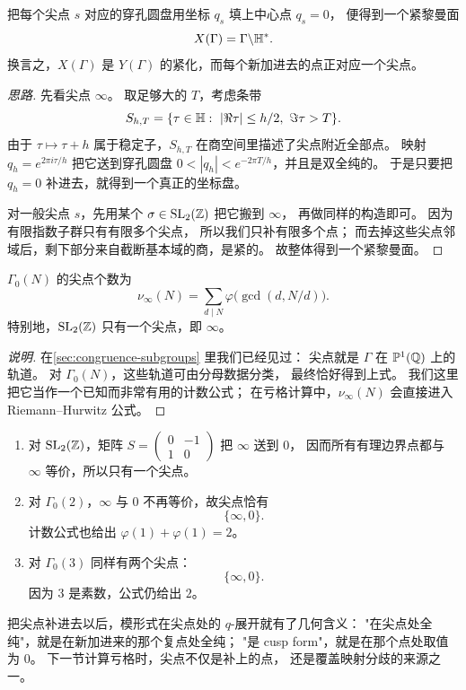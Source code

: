

\begin{theorem}
\label{thm:x-gamma-compact-riemann}
把每个尖点 $s$ 对应的穿孔圆盘用坐标 $q_s$ 填上中心点 $q_s=0$，
便得到一个紧黎曼面
\[
  X(\Gamma)=\Gamma\backslash\mathbb{H}^*.
\]
换言之，$X(\Gamma)$ 是 $Y(\Gamma)$ 的紧化，而每个新加进去的点正对应一个尖点。
\end{theorem}

\begin{proof}[思路]
先看尖点 $\infty$。
取足够大的 $T$，考虑条带
\[
  S_{h,T}=\{\tau\in\HH:\ |\Re\tau|\le h/2,\ \Im\tau>T\}.
\]
由于 $\tau\mapsto\tau+h$ 属于稳定子，$S_{h,T}$ 在商空间里描述了尖点附近全部点。
映射 $q_h=e^{2\pi i\tau/h}$ 把它送到穿孔圆盘
$0<|q_h|<e^{-2\pi T/h}$，并且是双全纯的。
于是只要把 $q_h=0$ 补进去，就得到一个真正的坐标盘。

对一般尖点 $s$，先用某个 $\sigma\in\mathrm{SL}_2(\mathbb{Z})$ 把它搬到 $\infty$，
再做同样的构造即可。
因为有限指数子群只有有限多个尖点，
所以我们只补有限多个点；
而去掉这些尖点邻域后，剩下部分来自截断基本域的商，是紧的。
故整体得到一个紧黎曼面。
\end{proof}

\begin{proposition}
\label{prop:number-of-cusps-gamma0N}
$\Gamma_0(N)$ 的尖点个数为
\[
  \nu_\infty(N)=\sum_{d\mid N}\varphi\bigl(\gcd(d,N/d)\bigr).
\]
特别地，$\mathrm{SL}_2(\mathbb{Z})$ 只有一个尖点，即 $\infty$。
\end{proposition}

\begin{proof}[说明]
在\cref{sec:congruence-subgroups} 里我们已经见过：
尖点就是 $\Gamma$ 在 $\mathbb{P}^1(\mathbb{Q})$ 上的轨道。
对 $\Gamma_0(N)$，这些轨道可由分母数据分类，
最终恰好得到上式。
我们这里把它当作一个已知而非常有用的计数公式；
在亏格计算中，$\nu_\infty(N)$ 会直接进入 Riemann--Hurwitz 公式。
\end{proof}

\begin{example}[$X(1)$、$X_0(2)$ 与 $X_0(3)$ 的尖点]
\label{ex:cusps-small-levels}
\begin{enumerate}
  \item 对 $\mathrm{SL}_2(\mathbb{Z})$，矩阵
    $S=\begin{pmatrix}0&-1\\1&0\end{pmatrix}$ 把 $\infty$ 送到 $0$，
    因而所有有理边界点都与 $\infty$ 等价，所以只有一个尖点。
  \item 对 $\Gamma_0(2)$，$\infty$ 与 $0$ 不再等价，故尖点恰有
    \[
      \{\infty,0\}.
    \]
    计数公式也给出
    $\varphi(1)+\varphi(1)=2$。
  \item 对 $\Gamma_0(3)$ 同样有两个尖点：
    \[
      \{\infty,0\}.
    \]
    因为 $3$ 是素数，公式仍给出 $2$。
\end{enumerate}
\end{example}

\begin{remark}
把尖点补进去以后，模形式在尖点处的 $q$-展开就有了几何含义：
"在尖点处全纯"，就是在新加进来的那个复点处全纯；
"是 cusp form"，就是在那个点处取值为 $0$。
下一节计算亏格时，尖点不仅是补上的点，
还是覆盖映射分歧的来源之一。
\end{remark}
